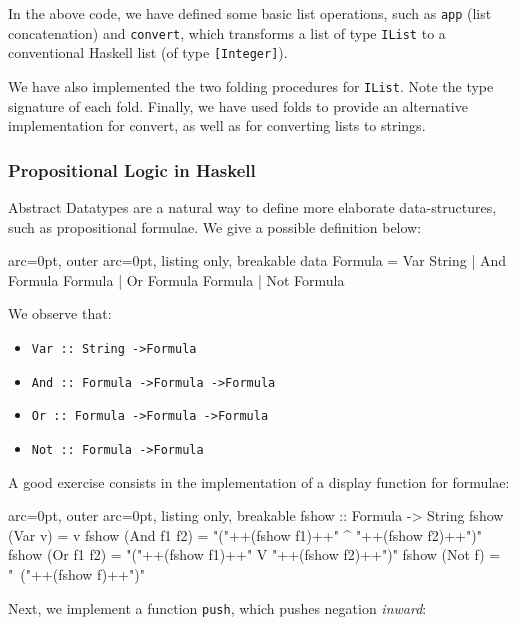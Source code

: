 In the above code, we have defined some basic list operations, such as \texttt{app} (list concatenation) and \texttt{convert}, which transforms a list of type \texttt{IList} to a conventional Haskell list (of type \texttt{[Integer]}).

We have also implemented the two folding procedures for \texttt{IList}. Note the type signature of each fold. Finally, we have used folds to provide an alternative implementation for convert, as well as for converting lists to strings.


\subsubsection*{ Propositional Logic in Haskell }

Abstract Datatypes are a natural way to define more elaborate data-structures, such as propositional formulae. We give a possible definition below:


\begin{tcblisting}{ arc=0pt, outer arc=0pt, listing only, breakable}
data Formula = Var String | And Formula Formula | Or Formula Formula | Not Formula

\end{tcblisting}


We observe that:
\begin{itemize}
	\item  \texttt{Var :: String -\textgreater  Formula}
	\item  \texttt{And :: Formula -\textgreater  Formula -\textgreater  Formula}
	\item  \texttt{Or :: Formula -\textgreater  Formula -\textgreater  Formula}
	\item  \texttt{Not :: Formula -\textgreater  Formula}
\end{itemize}

A good exercise consists in the implementation of a display function for formulae:

\begin{tcblisting}{ arc=0pt, outer arc=0pt, listing only, breakable}
fshow :: Formula -> String
fshow (Var v) = v
fshow (And f1 f2) = "("++(fshow f1)++" ^ "++(fshow f2)++")"
fshow (Or f1 f2) = "("++(fshow f1)++" V "++(fshow f2)++")"
fshow (Not f) = "~("++(fshow f)++")"

\end{tcblisting}


Next, we implement a function \texttt{push}, which pushes negation \textit{inward}:

